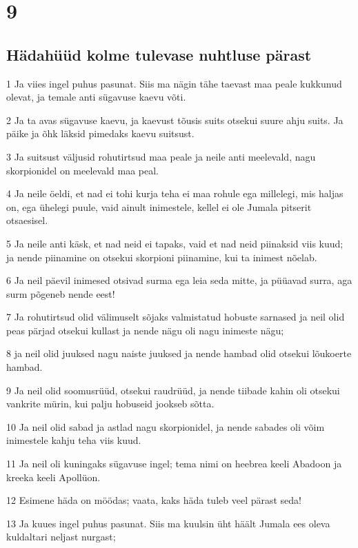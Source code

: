 \chapter{9}

\section*{Hädahüüd kolme tulevase nuhtluse pärast}

\par 1 Ja viies ingel puhus pasunat. Siis ma nägin tähe taevast maa peale kukkunud olevat, ja temale anti sügavuse kaevu võti.
\par 2 Ja ta avas sügavuse kaevu, ja kaevust tõusis suits otsekui suure ahju suits. Ja päike ja õhk läksid pimedaks kaevu suitsust.
\par 3 Ja suitsust väljusid rohutirtsud maa peale ja neile anti meelevald, nagu skorpionidel on meelevald maa peal.
\par 4 Ja neile öeldi, et nad ei tohi kurja teha ei maa rohule ega millelegi, mis haljas on, ega ühelegi puule, vaid ainult inimestele, kellel ei ole Jumala pitserit otsaesisel.
\par 5 Ja neile anti käsk, et nad neid ei tapaks, vaid et nad neid piinaksid viis kuud; ja nende piinamine on otsekui skorpioni piinamine, kui ta inimest nõelab.
\par 6 Ja neil päevil inimesed otsivad surma ega leia seda mitte, ja püüavad surra, aga surm põgeneb nende eest!
\par 7 Ja rohutirtsud olid välimuselt sõjaks valmistatud hobuste sarnased ja neil olid peas pärjad otsekui kullast ja nende nägu oli nagu inimeste nägu;
\par 8 ja neil olid juuksed nagu naiste juuksed ja nende hambad olid otsekui lõukoerte hambad.
\par 9 Ja neil olid soomusrüüd, otsekui raudrüüd, ja nende tiibade kahin oli otsekui vankrite mürin, kui palju hobuseid jookseb sõtta.
\par 10 Ja neil olid sabad ja astlad nagu skorpionidel, ja nende sabades oli võim inimestele kahju teha viis kuud.
\par 11 Ja neil oli kuningaks sügavuse ingel; tema nimi on heebrea keeli Abadoon ja kreeka keeli Apollüon.
\par 12 Esimene häda on möödas; vaata, kaks häda tuleb veel pärast seda!
\par 13 Ja kuues ingel puhus pasunat. Siis ma kuulsin üht häält Jumala ees oleva kuldaltari neljast nurgast;
